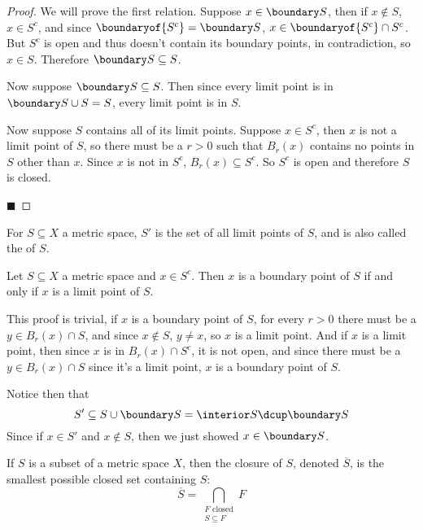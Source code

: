 \documentclass[10pt]{article}
\begin{document}
\begin{proof}

    We will prove the first relation.
    Suppose $x\in\boundary S$, then if $x\notin S$, $x\in S^c$, and since $\boundaryof{S^c}=\boundary S$, $x\in\boundaryof{S^c}\cap S^c$.
    But $S^c$ is open and thus doesn't contain its boundary points, in contradiction, so $x\in S$.
    Therefore $\boundary S\subseteq S$.

    Now suppose $\boundary S\subseteq S$.
    Then since every limit point is in $\boundary S\cup S=S$, every limit point is in $S$.

    Now suppose $S$ contains all of its limit points.
    Suppose $x\in S^c$, then $x$ is not a limit point of $S$, so there must be a $r>0$ such that $B_r(x)$ contains no points in $S$ other than $x$.
    Since $x$ is not in $S^c$, $B_r(x)\subseteq S^c$.
    So $S^c$ is open and therefore $S$ is closed.

    \hfill$\blacksquare$

\end{proof}

\begin{defn*}

    For $S\subseteq X$ a metric space, $S'$ is the set of all limit points of $S$, and is also called the  of $S$.

\end{defn*}

\begin{lemm*}

    Let $S\subseteq X$ a metric space and $x\in S^c$.
    Then $x$ is a boundary point of $S$ if and only if $x$ is a limit point of $S$.

\end{lemm*}

This proof is trivial, if $x$ is a boundary point of $S$, for every $r>0$ there must be a $y\in B_r(x)\cap S$, and since $x\notin S$, $y\neq x$, so $x$ is a limit point.
And if $x$ is a limit point, then since $x$ is in $B_r(x)\cap S^c$, it is not open, and since there must be a $y\in B_r(x)\cap S$ since it's a limit point, $x$ is a boundary
point of $S$.

Notice then that
\[ S' \subseteq S\cup \boundary S = \interior S\dcup\boundary S \]
Since if $x\in S'$ and $x\notin S$, then we just showed $x\in\boundary S$.

\begin{defn*}

    If $S$ is a subset of a metric space $X$, then the closure of $S$, denoted $\overline S$, is the smallest possible closed set containing $S$:
    \[ \overline S = \bigcap_{\substack{F \text{ closed} \\ S\subseteq F}} F \]

\end{defn*}
\end{document}
